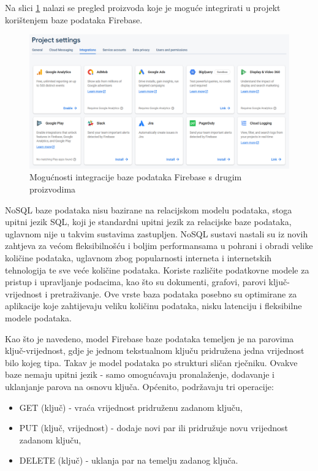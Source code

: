 Na slici \ref{fig:firebase_integration} nalazi se pregled proizvoda koje je moguće integrirati u projekt korištenjem baze podataka Firebase.

\begin{figure}[ht]
	\centering
	\includegraphics[scale=0.4]{imgs/firebase_integration}
	\caption{Mogućnosti integracije baze podataka Firebase s drugim proizvodima \cite{firebase}}
	\label{fig:firebase_integration}
\end{figure}

NoSQL baze podataka nisu bazirane na relacijskom modelu podataka, stoga upitni jezik SQL, koji je standardni upitni jezik za relacijske baze podataka, uglavnom nije u takvim sustavima zastupljen. NoSQL sustavi nastali su iz novih zahtjeva za većom fleksibilnošću i boljim performansama u pohrani i obradi velike količine podataka, uglavnom zbog popularnosti interneta i internetskih tehnologija te sve veće količine podataka. \cite{nosql} Koriste različite podatkovne modele za pristup i upravljanje podacima, kao što su dokumenti, grafovi, parovi ključ-vrijednost i pretraživanje. Ove vrste baza podataka posebno su optimirane za aplikacije koje zahtijevaju veliku količinu podataka, nisku latenciju i fleksibilne modele podataka. \cite{wat_zijn_nosql}

Kao što je navedeno, model Firebase baze podataka temeljen je na parovima ključ-vrijednost, gdje je jednom tekstualnom ključu pridružena jedna vrijednost bilo kojeg tipa. Takav je model podataka po strukturi sličan rječniku. Ovakve baze nemaju upitni jezik - samo omogućavaju pronalaženje, dodavanje i uklanjanje parova na osnovu ključa. Općenito, podržavaju tri operacije:
\begin{itemize}
	\item GET (ključ) - vraća vrijednost pridruženu zadanom ključu,
	\item PUT (ključ, vrijednost) - dodaje novi par ili pridružuje novu vrijednost zadanom ključu,
	\item DELETE (ključ) - uklanja par na temelju zadanog ključa.
\end{itemize}

